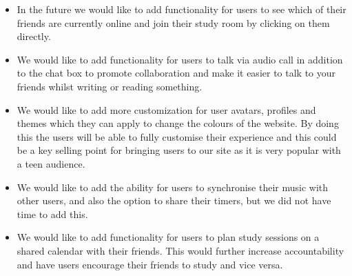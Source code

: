 \begin{itemize}
\item In the future we would like to add functionality for users to see which of their friends are currently online and join their study room by clicking on them directly.
\item We would like to add functionality for users to talk via audio call in addition to the chat box to promote collaboration and make it easier to talk to your friends whilst writing or reading something.
\item We would like to add more customization for user avatars, profiles and themes which they can apply to change the colours of the website. By doing this the users will be able to fully customise their experience and this could be a key selling point for bringing users to our site as it is very popular with a teen audience.
\item We would like to add the ability for users to synchronise their music with other users, and also the option to share their timers, but we did not have time to add this.
\item We would like to add functionality for users to plan study sessions on a shared calendar with their friends. This would further increase accountability and have users encourage their friends to study and vice versa.
\end{itemize}